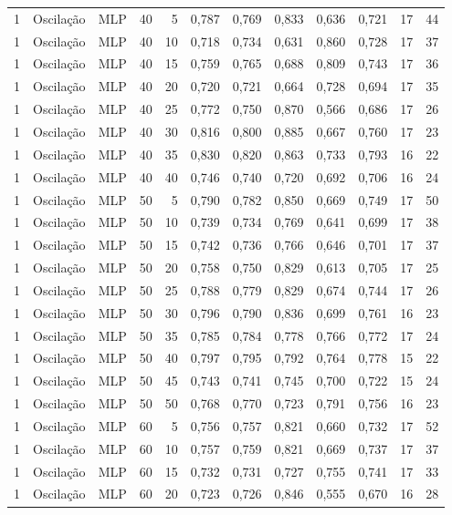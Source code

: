 \begin{longtable}{@{}rllrrrrrrrrr@{}}
1 & Oscilação & MLP & 40 & 5 & 0,787 & 0,769 & 0,833 & 0,636 & 0,721 & 17 & 44 \\
1 & Oscilação & MLP & 40 & 10 & 0,718 & 0,734 & 0,631 & 0,860 & 0,728 & 17 & 37 \\
1 & Oscilação & MLP & 40 & 15 & 0,759 & 0,765 & 0,688 & 0,809 & 0,743 & 17 & 36 \\
1 & Oscilação & MLP & 40 & 20 & 0,720 & 0,721 & 0,664 & 0,728 & 0,694 & 17 & 35 \\
1 & Oscilação & MLP & 40 & 25 & 0,772 & 0,750 & 0,870 & 0,566 & 0,686 & 17 & 26 \\
1 & Oscilação & MLP & 40 & 30 & 0,816 & 0,800 & 0,885 & 0,667 & 0,760 & 17 & 23 \\
1 & Oscilação & MLP & 40 & 35 & 0,830 & 0,820 & 0,863 & 0,733 & 0,793 & 16 & 22 \\
1 & Oscilação & MLP & 40 & 40 & 0,746 & 0,740 & 0,720 & 0,692 & 0,706 & 16 & 24 \\
1 & Oscilação & MLP & 50 & 5 & 0,790 & 0,782 & 0,850 & 0,669 & 0,749 & 17 & 50 \\
1 & Oscilação & MLP & 50 & 10 & 0,739 & 0,734 & 0,769 & 0,641 & 0,699 & 17 & 38 \\
1 & Oscilação & MLP & 50 & 15 & 0,742 & 0,736 & 0,766 & 0,646 & 0,701 & 17 & 37 \\
1 & Oscilação & MLP & 50 & 20 & 0,758 & 0,750 & 0,829 & 0,613 & 0,705 & 17 & 25 \\
1 & Oscilação & MLP & 50 & 25 & 0,788 & 0,779 & 0,829 & 0,674 & 0,744 & 17 & 26 \\
1 & Oscilação & MLP & 50 & 30 & 0,796 & 0,790 & 0,836 & 0,699 & 0,761 & 16 & 23 \\
1 & Oscilação & MLP & 50 & 35 & 0,785 & 0,784 & 0,778 & 0,766 & 0,772 & 17 & 24 \\
1 & Oscilação & MLP & 50 & 40 & 0,797 & 0,795 & 0,792 & 0,764 & 0,778 & 15 & 22 \\
1 & Oscilação & MLP & 50 & 45 & 0,743 & 0,741 & 0,745 & 0,700 & 0,722 & 15 & 24 \\
1 & Oscilação & MLP & 50 & 50 & 0,768 & 0,770 & 0,723 & 0,791 & 0,756 & 16 & 23 \\
1 & Oscilação & MLP & 60 & 5 & 0,756 & 0,757 & 0,821 & 0,660 & 0,732 & 17 & 52 \\
1 & Oscilação & MLP & 60 & 10 & 0,757 & 0,759 & 0,821 & 0,669 & 0,737 & 17 & 37 \\
1 & Oscilação & MLP & 60 & 15 & 0,732 & 0,731 & 0,727 & 0,755 & 0,741 & 17 & 33 \\
1 & Oscilação & MLP & 60 & 20 & 0,723 & 0,726 & 0,846 & 0,555 & 0,670 & 16 & 28 \\

\end{longtable}
